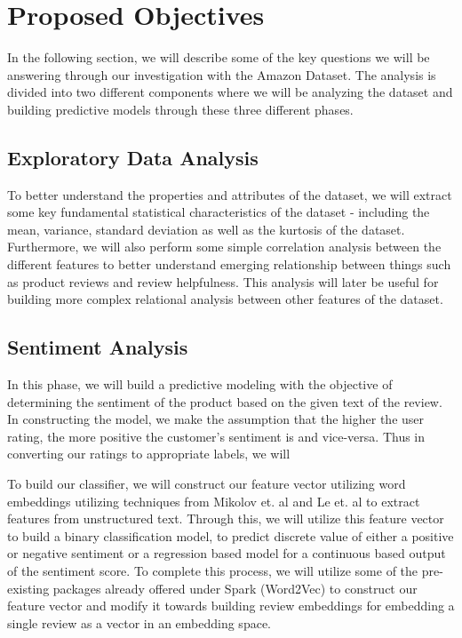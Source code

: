 \documentclass[a4paper, 11pt]{article}
\begin{document}
\section*{Proposed Objectives}
In the following section, we will describe some of the key questions we will be answering through our investigation with the Amazon Dataset. The analysis is divided into two different components where we will be analyzing the dataset and building predictive models through these three different phases.

\subsection{Exploratory Data Analysis}
To better understand the properties and attributes of the dataset, we will extract some key fundamental statistical characteristics of the dataset - including the mean, variance, standard deviation as well as the kurtosis of the dataset. Furthermore, we will also perform some simple correlation analysis between the different features to better understand emerging relationship between things such as product reviews and review helpfulness. This analysis will later be useful for building more complex relational analysis between other features of the dataset.


\subsection{Sentiment Analysis}
In this phase, we will build a predictive modeling with the objective of determining the sentiment of the product based on the given text of the review. In constructing the model, we make the assumption that the higher the user rating, the more positive the customer's sentiment is and vice-versa. Thus in converting our ratings to appropriate labels, we will 

To build our classifier, we will construct our feature vector utilizing word embeddings utilizing techniques from Mikolov et. al and Le et. al \cite{Mikolov,QuocLe14} to extract features from unstructured text. Through this, we will utilize this feature vector to build a binary classification model, to predict discrete value of either a positive or negative sentiment or a regression based model for a continuous based output of the sentiment score. To complete this process, we will utilize some of the pre-existing packages already offered under Spark (Word2Vec) to construct our feature vector and modify it towards building review embeddings for embedding a single review as a vector in an embedding space.
\end{document}
